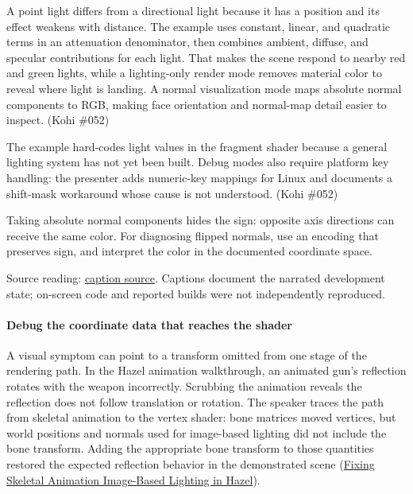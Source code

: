 \hypertarget{06-engine-ii-ch026-debugging-lighting-and-surface-direction}{}

A point light differs from a directional light because it has a position and its effect weakens with distance. The example uses constant, linear, and quadratic terms in an attenuation denominator, then combines ambient, diffuse, and specular contributions for each light. That makes the scene respond to nearby red and green lights, while a lighting-only render mode removes material color to reveal where light is landing. A normal visualization mode maps absolute normal components to RGB, making face orientation and normal-map detail easier to inspect. (Kohi \#052)

The example hard-codes light values in the fragment shader because a general lighting system has not yet been built. Debug modes also require platform key handling: the presenter adds numeric-key mappings for Linux and documents a shift-mask workaround whose cause is not understood. (Kohi \#052)

Taking absolute normal components hides the sign: opposite axis directions can receive the same color. For diagnosing flipped normals, use an encoding that preserves sign, and interpret the color in the documented coordinate space.

Source reading: \href{https://www.youtube.com/watch?v=uD_vLeHvM1M}{caption source}. Captions document the narrated development state; on-screen code and reported builds were not independently reproduced.

\paragraph{Debug the coordinate data that reaches the shader}\label{06-engine-ii-ch026-debug-the-coordinate-data-that-reaches-the-shader}

\hypertarget{06-engine-ii-ch026-debug-the-coordinate-data-that-reaches-the-shader}{}

A visual symptom can point to a transform omitted from one stage of the rendering path. In the Hazel animation walkthrough, an animated gun's reflection rotates with the weapon incorrectly. Scrubbing the animation reveals the reflection does not follow translation or rotation. The speaker traces the path from skeletal animation to the vertex shader: bone matrices moved vertices, but world positions and normals used for image-based lighting did not include the bone transform. Adding the appropriate bone transform to those quantities restored the expected reflection behavior in the demonstrated scene (\href{https://www.youtube.com/watch?v=fs9ChRr4VHM&t=4m18s}{Fixing Skeletal Animation Image-Based Lighting in Hazel}).

